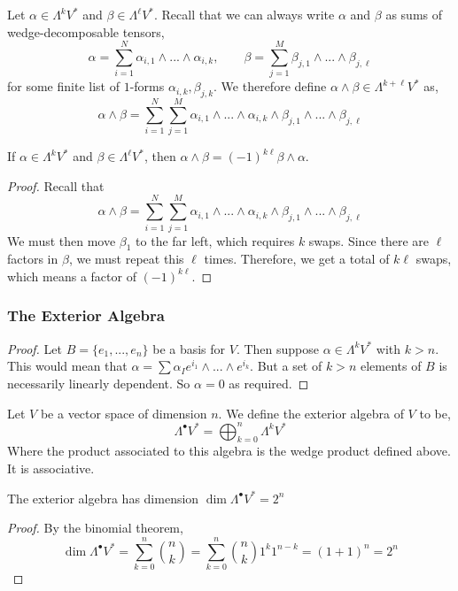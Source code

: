 \begin{defn}
    Let $\alpha\in \Lambda^k V^*$ and $\beta\in \Lambda^\ell V^*$.
    Recall that we can always write $\alpha$ and $\beta$ as sums of wedge-decomposable tensors,
    \[\alpha = \sum_{i=1}^N \alpha_{i,1}\wedge...\wedge \alpha_{i,k},\qquad \beta = \sum_{j=1}^M \beta_{j,1}\wedge...\wedge \beta_{j,\ell}\]
    for some finite list of $1$-forms $\alpha_{i,k}, \beta_{j,k}$.
    We therefore define $\alpha\wedge \beta\in\Lambda^{k+\ell}V^*$ as, 
    \[\alpha\wedge\beta = \sum_{i=1}^N\sum_{j=1}^M  \alpha_{i,1}\wedge...\wedge \alpha_{i,k}\wedge \beta_{j,1}\wedge...\wedge \beta_{j,\ell}\]
\end{defn}
\begin{lemma}
    If $\alpha \in \Lambda^k V^*$ and $\beta \in \Lambda^\ell V^*$, then $\alpha \wedge \beta = (-1)^{k\ell} \beta\wedge \alpha$.
\end{lemma}
\begin{proof}Recall that
\[\alpha\wedge\beta = \sum_{i=1}^N\sum_{j=1}^M  \alpha_{i,1}\wedge...\wedge \alpha_{i,k}\wedge \beta_{j,1}\wedge...\wedge \beta_{j,\ell}\]
We must then move $\beta_1$ to the far left, which requires $k$ swaps. Since there are $\ell$ factors in $\beta$, we must repeat this $\ell$ times. Therefore, we get a total of $k\ell$ swaps, which means a factor of $(-1)^{k\ell}$.
\end{proof}
\subsubsection{The Exterior Algebra}
\begin{proof}
    Let $B = \{e_1,...,e_n\}$ be a basis for $V$. Then suppose $\alpha \in \Lambda^k V^*$ with $k>n$. This would mean that $\alpha = \sum \alpha_{I} e^{i_1}\wedge...\wedge e^{i_k}$. But a set of $k>n$ elements of $B$ is necessarily linearly dependent. So $\alpha=0$ as required.
\end{proof}

\begin{defn} Let $V$ be a vector space of dimension $n$. We define the exterior algebra of $V$ to be,
\begin{equation}
    \Lambda^\bullet V^* = \bigoplus_{k=0}^n \Lambda^k V^*
\end{equation}
Where the product associated to this algebra is the wedge product defined above. It is associative.
\end{defn}
\begin{thm}
The exterior algebra has dimension $\dim \Lambda^\bullet V^* = 2^n$
\end{thm}
\begin{proof}
     By the binomial theorem,
     \[\dim \Lambda^\bullet V^*=\sum_{k=0}^n \binom{n}{k}=\sum_{k=0}^n \binom{n}{k}1^k 1^{n-k} = (1+1)^n = 2^n\]
\end{proof}

